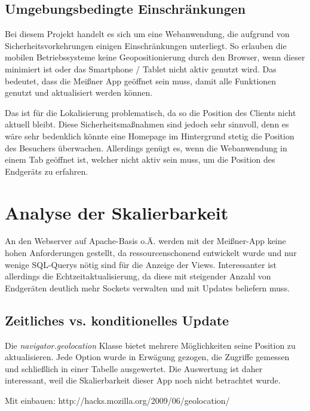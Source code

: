 \subsection{Umgebungsbedingte Einschränkungen}
Bei diesem Projekt handelt es sich um eine Webanwendung, die aufgrund von Sicherheitsvorkehrungen einigen Einschränkungen unterliegt. So erlauben die mobilen Betriebssysteme keine Geopositionierung durch den Browser, wenn dieser minimiert ist oder das Smartphone / Tablet nicht aktiv genutzt wird. Das bedeutet, dass die Meißner App geöffnet sein muss, damit alle Funktionen genutzt und aktualisiert werden können.\par

Das ist für die Lokalisierung problematisch, da so die Position des Clients nicht aktuell bleibt. Diese Sicherheitsmaßnahmen sind jedoch sehr sinnvoll, denn es wäre sehr bedenklich könnte eine Homepage im Hintergrund stetig die Position des Besuchers überwachen. Allerdings genügt es, wenn die Webanwendung in einem Tab geöffnet ist, welcher nicht aktiv sein muss, um die Position des Endgeräts zu erfahren.


\section{Analyse der Skalierbarkeit}
An den Webserver auf Apache-Basis o.Ä. werden mit der Meißner-App keine hohen Anforderungen gestellt, da ressourcenschonend entwickelt wurde und nur wenige SQL-Querys nötig sind für die Anzeige der Views. Interessanter ist allerdings die Echtzeitaktualisierung, da diese mit steigender Anzahl von Endgeräten deutlich mehr Sockets verwalten und mit Updates beliefern muss.

\subsection{Zeitliches vs. konditionelles Update}
Die \emph{navigator.geolocation} Klasse bietet mehrere Möglichkeiten seine Position zu aktualisieren. Jede Option wurde in Erwägung gezogen, die Zugriffe gemessen und schließlich in einer Tabelle ausgewertet. Die Auswertung ist daher interessant, weil die Skalierbarkeit dieser App noch nicht betrachtet wurde.\par

Mit einbauen: http://hacks.mozilla.org/2009/06/geolocation/\par

